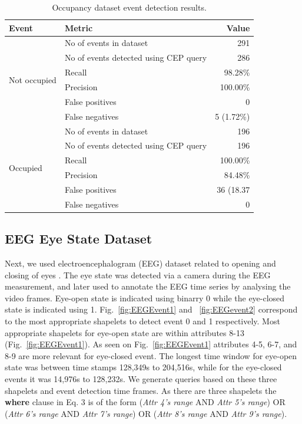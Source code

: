 \documentclass[conference]{IEEEtran}  %
\begin{document}
\begin{table}
\caption{Occupancy dataset event detection results.}
\begin{tabular}{ |l|l|l| }
\hline
\textbf{Event} & \textbf{Metric} & \multicolumn{1}{|r|}{\textbf{Value}}\\
\hline
\multirow{6}{*}{Not occupied} & No of events in dataset & \multicolumn{1}{|r|}{291}\\
    & No of events detected using CEP query & \multicolumn{1}{|r|}{286}\\ 
    & Recall & \multicolumn{1}{|r|}{98.28\%}\\
    & Precision & \multicolumn{1}{|r|}{100.00\%}\\
    & False positives & \multicolumn{1}{|r|}{0}\\
    & False negatives & \multicolumn{1}{|r|}{5 (1.72\%)}\\
\hline
\multirow{6}{*}{Occupied} & No of events in dataset & \multicolumn{1}{|r|}{196}\\
    & No of events detected using CEP query & \multicolumn{1}{|r|}{196}\\
    & Recall & \multicolumn{1}{|r|}{100.00\%}\\
    & Precision & \multicolumn{1}{|r|}{84.48\%}\\
    & False positives & \multicolumn{1}{|r|}{36 (18.37}\\
    & False negatives & \multicolumn{1}{|r|}{0}\\
\hline
\end{tabular}
\squeezeup\squeezeup
\end{table}


\subsection{EEG Eye State Dataset}
Next, we used electroencephalogram (EEG) dataset related to opening and closing of eyes \cite{IEEEexample:EEG}. The eye state was detected via a camera during the EEG measurement, and later used to annotate the EEG time series by analysing the video frames. Eye-open state is indicated using binarry 0 while the eye-closed state is indicated using 1. Fig.~\ref{fig:EEGEvent1} and ~\ref{fig:EEGevent2} correspond to the most appropriate shapelets to detect event 0 and 1 respectively. Most appropriate shapelets for eye-open state are within attributes 8-13 (Fig.~\ref{fig:EEGEvent1}). As seen on Fig.~\ref{fig:EEGEvent1} attributes 4-5, 6-7, and 8-9 are more relevant for eye-closed event. The longest time window for eye-open state was between time stamps 128,349s to 204,516s, while for the eye-closed events it was 14,976s to 128,232s. We generate queries based on these three shapelets and event detection time frames. As there are three shapelets the \textbf{where} clause in Eq. 3 is of the form (\textit{Attr 4's range} AND \textit{Attr 5's range}) OR (\textit{Attr 6's range} AND \textit{Attr 7's range}) OR (\textit{Attr 8's range} AND \textit{Attr 9's range}).
\end{document}
